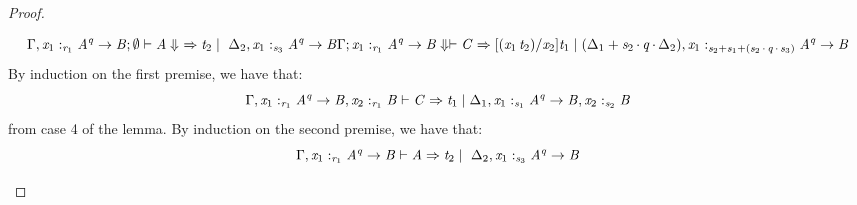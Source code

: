 \begin{proof}
\begin{enumerate}
\begin{enumerate}
\[{            \Gamma  \GRANULEsym{,}   \GRANULEmv{x_{{\mathrm{1}}}}  :_{\textcolor{coeffectColor}{  \GRANULEnt{r_{{\mathrm{1}}}}  } }    \GRANULEnt{A} ^ \GRANULEnt{q}  \rightarrow  \GRANULEnt{B} ; \emptyset \vdash \GRANULEnt{A} \Downarrow\ \Rightarrow \GRANULEnt{t_{{\mathrm{2}}}} \mid\ \Delta_{{\mathrm{2}}}  \GRANULEsym{,}   \GRANULEmv{x_{{\mathrm{1}}}}  :_{\textcolor{coeffectColor}{  \GRANULEnt{s_{{\mathrm{3}}}}  } }    \GRANULEnt{A} ^ \GRANULEnt{q}  \rightarrow  \GRANULEnt{B}
            }
            {
            \Gamma  ;    \GRANULEmv{x_{{\mathrm{1}}}}  :_{\textcolor{coeffectColor}{  \GRANULEnt{r_{{\mathrm{1}}}}  } }    \GRANULEnt{A} ^ \GRANULEnt{q}  \rightarrow  \GRANULEnt{B}     \Downarrow \vdash  \GRANULEnt{C}  \Rightarrow    [  \GRANULEsym{(}  \GRANULEmv{x_{{\mathrm{1}}}} \, \GRANULEnt{t_{{\mathrm{2}}}}  \GRANULEsym{)}  /  \GRANULEmv{x_{{\mathrm{2}}}}  ]  \GRANULEnt{t_{{\mathrm{1}}}}    \mid  \GRANULEsym{(}  \Delta_{{\mathrm{1}}}  \GRANULEsym{+}   \textcolor{coeffectColor}{ \GRANULEnt{s_{{\mathrm{2}}}}   \textcolor{coeffectColor}{\,\cdot\,} }    \textcolor{coeffectColor}{ \GRANULEnt{q}   \textcolor{coeffectColor}{\,\cdot\,} }  \Delta_{{\mathrm{2}}}     \GRANULEsym{)}  \GRANULEsym{,}   \GRANULEmv{x_{{\mathrm{1}}}}  :_{\textcolor{coeffectColor}{   \GRANULEnt{s_{{\mathrm{2}}}}  \GRANULEsym{+}   \GRANULEnt{s_{{\mathrm{1}}}}  \GRANULEsym{+}   \GRANULEsym{(}  \GRANULEnt{s_{{\mathrm{2}}}}  \textcolor{coeffectColor}{\,\cdot\,}   \GRANULEnt{q}  \textcolor{coeffectColor}{\,\cdot\,}  \GRANULEnt{s_{{\mathrm{3}}}}   \GRANULEsym{)}     } }    \GRANULEnt{A} ^ \GRANULEnt{q}  \rightarrow  \GRANULEnt{B}
            }
            \]
            By induction on the first premise, we have that:
            \[
\Gamma  \GRANULEsym{,}   \GRANULEmv{x_{{\mathrm{1}}}}  :_{\textcolor{coeffectColor}{  \GRANULEnt{r_{{\mathrm{1}}}}  } }    \GRANULEnt{A} ^ \GRANULEnt{q}  \rightarrow  \GRANULEnt{B}    \GRANULEsym{,}    \GRANULEmv{x_{{\mathrm{2}}}}  :_{\textcolor{coeffectColor}{  \GRANULEnt{r_{{\mathrm{1}}}}  } }   \GRANULEnt{B}    \vdash  \GRANULEnt{C}  \Rightarrow  \GRANULEnt{t_{{\mathrm{1}}}}  \mid  \Delta_{{\mathrm{1}}}  \GRANULEsym{,}   \GRANULEmv{x_{{\mathrm{1}}}}  :_{\textcolor{coeffectColor}{  \GRANULEnt{s_{{\mathrm{1}}}}  } }    \GRANULEnt{A} ^ \GRANULEnt{q}  \rightarrow  \GRANULEnt{B}    \GRANULEsym{,}   \GRANULEmv{x_{{\mathrm{2}}}}  :_{\textcolor{coeffectColor}{  \GRANULEnt{s_{{\mathrm{2}}}}  } }   \GRANULEnt{B}
            \]
            from case 4 of the lemma. By induction on the second premise, we have that:
            \[
            \Gamma  \GRANULEsym{,}   \GRANULEmv{x_{{\mathrm{1}}}}  :_{\textcolor{coeffectColor}{  \GRANULEnt{r_{{\mathrm{1}}}}  } }    \GRANULEnt{A} ^ \GRANULEnt{q}  \rightarrow  \GRANULEnt{B} \vdash \GRANULEnt{A} \Rightarrow \GRANULEnt{t_{{\mathrm{2}}}} \mid\ \Delta_{{\mathrm{2}}}  \GRANULEsym{,}   \GRANULEmv{x_{{\mathrm{1}}}}  :_{\textcolor{coeffectColor}{  \GRANULEnt{s_{{\mathrm{3}}}}  } }    \GRANULEnt{A} ^ \GRANULEnt{q}  \rightarrow  \GRANULEnt{B}
\]
\end{enumerate}
\end{enumerate}
\end{proof}

